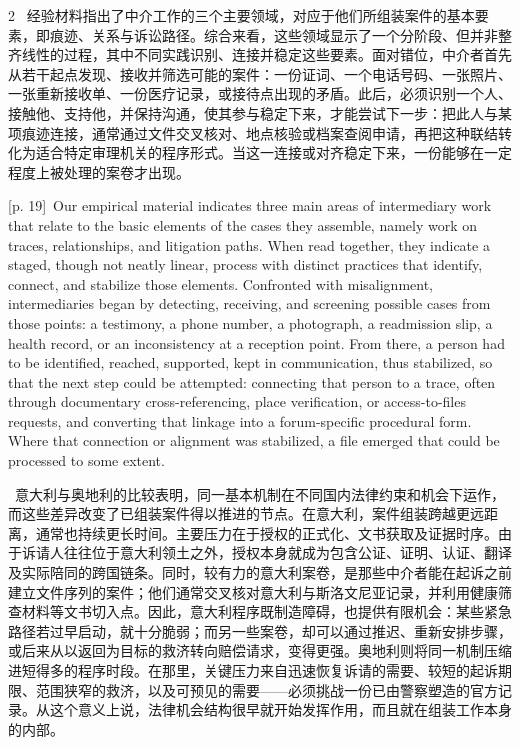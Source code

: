 \documentclass[10pt,a4paper]{article}
\begin{document}
\begin{paracol}{2}
\switchcolumn*
{\scriptsize\color{gray} [p. 19]}\ 经验材料指出了中介工作的三个主要领域，对应于他们所组装案件的基本要素，即痕迹、关系与诉讼路径。综合来看，这些领域显示了一个分阶段、但并非整齐线性的过程，其中不同实践识别、连接并稳定这些要素。面对错位，中介者首先从若干起点发现、接收并筛选可能的案件：一份证词、一个电话号码、一张照片、一张重新接收单、一份医疗记录，或接待点出现的矛盾。此后，必须识别一个人、接触他、支持他，并保持沟通，使其参与稳定下来，才能尝试下一步：把此人与某项痕迹连接，通常通过文件交叉核对、地点核验或档案查阅申请，再把这种联结转化为适合特定审理机关的程序形式。当这一连接或对齐稳定下来，一份能够在一定程度上被处理的案卷才出现。\par
\switchcolumn
{\scriptsize\color{gray} [p. 19]}\ Our empirical material indicates three main areas of intermediary work that relate to the basic elements of the cases they assemble, namely work on traces, relationships, and litigation paths. When read together, they indicate a staged, though not neatly linear, process with distinct practices that identify, connect, and stabilize those elements. Confronted with misalignment, intermediaries began by detecting, receiving, and screening possible cases from those points: a testimony, a phone number, a photograph, a readmission slip, a health record, or an inconsistency at a reception point. From there, a person had to be identified, reached, supported, kept in communication, thus stabilized, so that the next step could be attempted: connecting that person to a trace, often through documentary cross-referencing, place verification, or access-to-files requests, and converting that linkage into a forum-specific procedural form. Where that connection or alignment was stabilized, a file emerged that could be processed to some extent.\par
\switchcolumn*
{\scriptsize\color{gray} [p. 19]}\ 意大利与奥地利的比较表明，同一基本机制在不同国内法律约束和机会下运作，而这些差异改变了已组装案件得以推进的节点。在意大利，案件组装跨越更远距离，通常也持续更长时间。主要压力在于授权的正式化、文书获取及证据时序。由于诉请人往往位于意大利领土之外，授权本身就成为包含公证、证明、认证、翻译及实际陪同的跨国链条。同时，较有力的意大利案卷，是那些中介者能在起诉之前建立文件序列的案件；他们通常交叉核对意大利与斯洛文尼亚记录，并利用健康筛查材料等文书切入点。因此，意大利程序既制造障碍，也提供有限机会：某些紧急路径若过早启动，就十分脆弱；而另一些案卷，却可以通过推迟、重新安排步骤，或后来从以返回为目标的救济转向赔偿请求，变得更强。奥地利则将同一机制压缩进短得多的程序时段。在那里，关键压力来自迅速恢复诉请的需要、较短的起诉期限、范围狭窄的救济，以及可预见的需要——必须挑战一份已由警察塑造的官方记录。从这个意义上说，法律机会结构很早就开始发挥作用，而且就在组装工作本身的内部。\par

\end{paracol}
\end{document}
